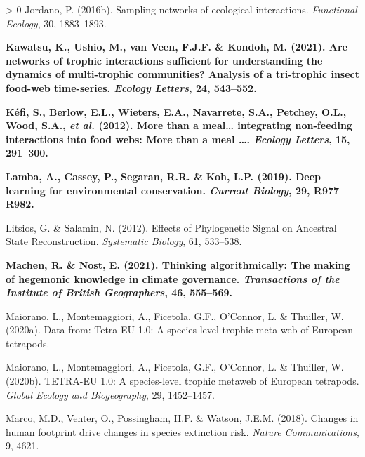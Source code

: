 \documentclass[11pt]{article}
\makeatletter
\def\maxwidth{\ifdim\Gin@nat@width>\linewidth\linewidth
\else\Gin@nat@width\fi}
\let\Oldincludegraphics\includegraphics
\renewcommand{\includegraphics}[1]{\Oldincludegraphics[width=\maxwidth]{#1}}
\newlength{\cslhangindent}
\newenvironment{CSLReferences}[3] %
 {%
  \setlength{\parindent}{0pt}
  \ifodd #1 \everypar{\setlength{\hangindent}{\cslhangindent}}\ignorespaces\fi
  \ifnum #2 > 0
  \setlength{\parskip}{#2\baselineskip}
  \fi
 }%
 {}
\providecommand{\DIFaddtex}[1]{{\bf #1}} %
\providecommand{\DIFaddbegin}{\protect\color{blue}} %
\providecommand{\DIFaddend}{\protect\color{black}} %
\providecommand{\DIFdelbegin}{\protect\color{red}} %
\providecommand{\DIFdelend}{\protect\color{black}} %
\providecommand{\DIFadd}[1]{\texorpdfstring{\DIFaddtex{#1}}{#1}} %
\newcommand{\DIFscaledelfig}{0.5}
\newlength{\DIFdelgraphicswidth} %
\newlength{\DIFdelgraphicsheight} %
\newcommand{\DIFaddincludegraphics}[2][]{{\color{blue}\fbox{\DIFOincludegraphics[#1]{#2}}}} %
\newcommand{\DIFdelincludegraphics}[2][]{%
\sbox{\DIFdelgraphicsbox}{\DIFOincludegraphics[#1]{#2}}%
\settoboxwidth{\DIFdelgraphicswidth}{\DIFdelgraphicsbox} %
\settoboxtotalheight{\DIFdelgraphicsheight}{\DIFdelgraphicsbox} %
\scalebox{\DIFscaledelfig}{%
\parbox[b]{\DIFdelgraphicswidth}{\usebox{\DIFdelgraphicsbox}\\[-\baselineskip] \rule{\DIFdelgraphicswidth}{0em}}\llap{\resizebox{\DIFdelgraphicswidth}{\DIFdelgraphicsheight}{%
\setlength{\unitlength}{\DIFdelgraphicswidth}%
\begin{picture}(1,1)%
\thicklines\linethickness{2pt} %
{\color[rgb]{1,0,0}\put(0,0){\framebox(1,1){}}}%
{\color[rgb]{1,0,0}\put(0,0){\line( 1,1){1}}}%
{\color[rgb]{1,0,0}\put(0,1){\line(1,-1){1}}}%
\end{picture}%
}\hspace*{3pt}}} %
} %
\DeclareRobustCommand{\DIFaddbegin}{\DIFOaddbegin \let\includegraphics\DIFaddincludegraphics} %
\DeclareRobustCommand{\DIFaddend}{\DIFOaddend \let\includegraphics\DIFOincludegraphics} %
\DeclareRobustCommand{\DIFdelbegin}{\DIFOdelbegin \let\includegraphics\DIFdelincludegraphics} %
\DeclareRobustCommand{\DIFdelend}{\DIFOaddend \let\includegraphics\DIFOincludegraphics} %
\makeatother
\begin{document}
\begin{CSLReferences}{1}{0}
\leavevmode\hypertarget{ref-Jordano2016SamNet}{}%
Jordano, P. (2016b). Sampling networks of ecological interactions.
\emph{Functional Ecology}, 30, 1883--1893.

\leavevmode\DIFaddbegin \hypertarget{ref-Kawatsu2021AreNet}{}%
\DIFadd{Kawatsu, K., Ushio, M., van Veen, F.J.F. \& Kondoh, M. (2021). Are
networks of trophic interactions sufficient for understanding the
dynamics of multi-trophic communities? Analysis of a tri-trophic insect
food-web time-series. \emph{Ecology Letters}, 24, 543--552.
}

\leavevmode\hypertarget{ref-Kefi2012MorMea}{}%
\DIFadd{Kéfi, S., Berlow, E.L., Wieters, E.A., Navarrete, S.A., Petchey, O.L.,
Wood, S.A., \emph{et al.} (2012). More than a meal\ldots{} integrating
non-feeding interactions into food webs: More than a meal \ldots.
\emph{Ecology Letters}, 15, 291--300.
}

\leavevmode\hypertarget{ref-Lamba2019DeeLea}{}%
\DIFadd{Lamba, A., Cassey, P., Segaran, R.R. \& Koh, L.P. (2019). Deep learning
for environmental conservation. \emph{Current Biology}, 29, R977--R982.
}

\leavevmode\DIFaddend \hypertarget{ref-Litsios2012EffPhy}{}%
Litsios, G. \& Salamin, N. (2012). Effects of Phylogenetic Signal on
Ancestral State Reconstruction. \emph{Systematic Biology}, 61, 533--538.

\leavevmode\DIFaddbegin \hypertarget{ref-Machen2021ThiAlg}{}%
\DIFadd{Machen, R. \& Nost, E. (2021). Thinking algorithmically: The making of
hegemonic knowledge in climate governance. \emph{Transactions of the
Institute of British Geographers}, 46, 555--569.
}

\leavevmode\DIFaddend \hypertarget{ref-Maiorano2020DatTet}{}%
Maiorano, L., Montemaggiori, A., Ficetola, G.F., O'Connor, L. \&
Thuiller, W. (2020a). Data from: Tetra-EU 1.0: A species-level trophic
meta-web of European tetrapods.

\leavevmode\DIFdelbegin %
\DIFdelend \DIFaddbegin \hypertarget{ref-Maiorano2020Tet10}{}\DIFaddend %
Maiorano, L., Montemaggiori, A., Ficetola, G.F., O'Connor, L. \&
Thuiller, W. (2020b). TETRA-EU 1.0: A species-level trophic metaweb of
European tetrapods. \emph{Global Ecology and Biogeography}, 29,
1452--1457.

\leavevmode\hypertarget{ref-Marco2018ChaHum}{}%
Marco, M.D., Venter, O., Possingham, H.P. \& Watson, J.E.M. (2018).
Changes in human footprint drive changes in species extinction risk.
\emph{Nature Communications}, 9, 4621.


\end{CSLReferences}
\end{document}
